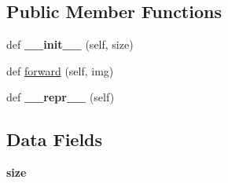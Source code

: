 \subsection*{Public Member Functions}
\begin{DoxyCompactItemize}
\item 
\mbox{\label{classtorchvision_1_1transforms_1_1transforms_1_1FiveCrop_a5a6bbccd2a9880c1b6a64e96b834d36a}} 
def {\bfseries \+\_\+\+\_\+init\+\_\+\+\_\+} (self, size)
\item 
def \hyperlink{classtorchvision_1_1transforms_1_1transforms_1_1FiveCrop_a491671efa0135d22dd0b5b155787936c}{forward} (self, img)
\item 
\mbox{\label{classtorchvision_1_1transforms_1_1transforms_1_1FiveCrop_a5e4f2b4e095c2ddf5424cf0c739c09c7}} 
def {\bfseries \+\_\+\+\_\+repr\+\_\+\+\_\+} (self)
\end{DoxyCompactItemize}
\subsection*{Data Fields}
\begin{DoxyCompactItemize}
\item 
\mbox{\label{classtorchvision_1_1transforms_1_1transforms_1_1FiveCrop_a9fdc0e8ee5f19a3cde457602ee221922}} 
{\bfseries size}
\end{DoxyCompactItemize}


